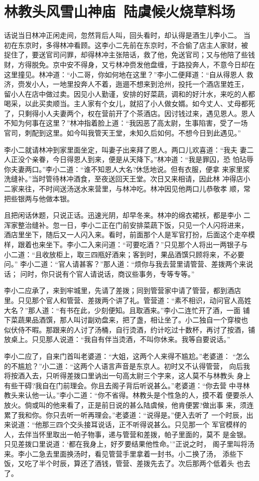\chapter{林教头风雪山神庙~陆虞候火烧草料场}

话说当日林冲正闲走间，忽然背后人叫，回头看时，却认得是酒生儿李小二。
当初在东京时，多得林冲看顾。这李小二先前在东京时，不合偷了店主人家财，被
捉住了，要送官司问罪，却得林冲主张陪话，救了他，免送官司；又与他陪了些钱
财，方得脱免。京中安不得身，又亏林冲赍发他盘缠，于路投奔人，不意今日却在
这里撞见。林冲道：“小二哥，你如何地在这里？”李小二便拜道：“自从得恩人
救济，赍发小人，一地里投奔人不着，迤逦不想来到沧州，投托一个酒店里姓王，
留小人在店中做过卖。因见小人勤谨，安排的好菜蔬，调和的好汁水，来吃的人都
喝采，以此买卖顺当。主人家有个女儿，就招了小人做女婿。如今丈人、丈母都死
了，只剩得小人夫妻两个，权在营前开了个茶酒店。因讨钱过来，遇见恩人。恩人
不知为何事在这里？”林冲指着脸上道：“我因恶了高太尉，生事陷害，受了一场
官司，刺配到这里。如今叫我管天王堂，未知久后如何。不想今日到此遇见。”

李小二就请林冲到家里面坐定，叫妻子出来拜了恩人。两口儿欢喜道：“我夫
妻二人正没个亲眷，今日得恩人到来，便是从天降下。”林冲道：“我是罪囚，恐
怕玷辱你夫妻两口。”李小二道：“谁不知恩人大名?休恁地说。但有衣服，便拿
来家里浆洗缝补。”当时管待林冲酒食，至夜送回天王堂。次日又来相请，因此林
冲得店小二家来往，不时间送汤送水来营里，与林冲吃。林冲因见他两口儿恭敬孝
顺，常把些银两与他做本银。

且把闲话休题，只说正话。迅速光阴，却早冬来。林冲的绵衣裙袄，都是李小
二浑家整治缝补。忽一日，李小二正在门前安排菜蔬下饭，只见一个人闪将进来，
酒店里坐下，随后又一人闪入来。看时，前面那个人是军官打扮，后面这个走卒模
样，跟着也来坐下。李小二入来问道：“可要吃酒？”只见那个人将出一两银子与
小二道：“且收放柜上，取三四瓶好酒来；客到时，果品酒馔只顾将来，不必要问。”
李小二道：“官人请甚客？”那人道：“烦你与我去营里请管营、差拨两个来说话；
问时，你只说有个官人请说话，商议些事务，专等专等。”

李小二应承了，来到牢城里，先请了差拨；同到管营家中请了管营，都到酒店
里。只见那个官人和管营、差拨两个讲了礼。管营道：“素不相识，动问官人高姓
大名？”那人道：“有书在此，少刻便知。且取酒来。”李小二连忙开了酒，一面
铺下菜蔬果品酒馔，那人叫讨副劝盘来，把了盏，相让坐了。小二独自一个穿梭也
似伏侍不暇。那跟来的人讨了汤桶，自行烫酒，约计吃过十数杯，再讨了按酒，铺
放桌上。只见那人说道：“我自有伴当烫酒，不叫你休来。我等自要说话。”

李小二应了，自来门首叫老婆道：“大姐，这两个人来得不尴尬。”老婆道：
“怎么的不尴尬？”小二道：“这两个人语言声音是东京人。初时又不认得管营，
向后我将按酒入去，只听得差拨口里讷出一句高太尉三个字来，这人莫不与林教头
身上有些干碍?我自在门前理会。你且去阁子背后听说甚么。”老婆道：“你去营
中寻林教头来认他一认。”李小二道：“你不省得。林教头是个性急的人，摸不着
便要杀人放火。倘或叫的他来看了，正是前日说的甚么陆虞候，他肯便罢?做出事
来，须连累了我和你。你只去听一听再理会。”老婆道：“说得是。”便入去听了
一个时辰，出来说道：“他那三四个交头接耳说话，正不听得说甚么。只见那一个
军官模样的人，去伴当怀里取出一帕子物事，递与管营和差拨，帕子里面的，莫不
是金银。只见差拨口里说道：‘都在我身上，好歹要结果他性命。’”正说之时，
阁子里叫将汤来。李小二急去里面换汤时，看见管营手里拿着一封书。小二换了汤，
添些下饭，又吃了半个时辰，算还了酒钱，管营、差拨先去了。次后那两个低着头
也去了。

